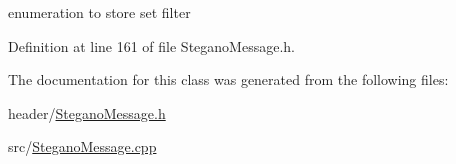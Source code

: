enumeration to store set filter 

Definition at line 161 of file Stegano\+Message.\+h.



The documentation for this class was generated from the following files\+:\begin{DoxyCompactItemize}
\item 
header/\mbox{\hyperlink{SteganoMessage_8h}{Stegano\+Message.\+h}}\item 
src/\mbox{\hyperlink{SteganoMessage_8cpp}{Stegano\+Message.\+cpp}}\end{DoxyCompactItemize}
